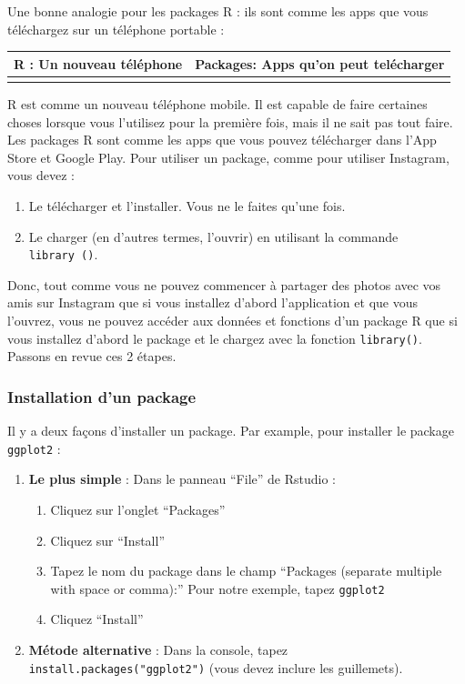 \documentclass[a4paperpaper,]{article}
\providecommand{\tightlist}{%
  \setlength{\itemsep}{0pt}\setlength{\parskip}{0pt}}
\theoremstyle{definition}
\theoremstyle{definition}
\theoremstyle{definition}
\theoremstyle{remark}
\begin{document}
Une bonne analogie pour les packages R : ils sont comme les apps que
vous téléchargez sur un téléphone portable :

\begin{longtable}[]{@{}cc@{}}
\toprule
R : Un nouveau téléphone & Packages: Apps qu'on peut
telécharger\tabularnewline
\midrule
\endhead
&\tabularnewline
\bottomrule
\end{longtable}

R est comme un nouveau téléphone mobile. Il est capable de faire
certaines choses lorsque vous l'utilisez pour la première fois, mais il
ne sait pas tout faire. Les packages R sont comme les apps que vous
pouvez télécharger dans l'App Store et Google Play. Pour utiliser un
package, comme pour utiliser Instagram, vous devez :

\begin{enumerate}
\def\labelenumi{\arabic{enumi}.}
\tightlist
\item
  Le télécharger et l'installer. Vous ne le faites qu'une fois.
\item
  Le charger (en d'autres termes, l'ouvrir) en utilisant la commande
  \texttt{library\ ()}.
\end{enumerate}

Donc, tout comme vous ne pouvez commencer à partager des photos avec vos
amis sur Instagram que si vous installez d'abord l'application et que
vous l'ouvrez, vous ne pouvez accéder aux données et fonctions d'un
package R que si vous installez d'abord le package et le chargez avec la
fonction \texttt{library()}. Passons en revue ces 2 étapes.

\subsubsection{Installation d'un
package}\label{installation-dun-package}

Il y a deux façons d'installer un package. Par example, pour installer
le package \texttt{ggplot2} :

\begin{enumerate}
\def\labelenumi{\arabic{enumi}.}
\tightlist
\item
  \textbf{Le plus simple} : Dans le panneau ``File'' de Rstudio :

  \begin{enumerate}
  \def\labelenumii{\alph{enumii})}
  \tightlist
  \item
    Cliquez sur l'onglet ``Packages''
  \item
    Cliquez sur ``Install''
  \item
    Tapez le nom du package dans le champ ``Packages (separate multiple
    with space or comma):'' Pour notre exemple, tapez \texttt{ggplot2}
  \item
    Cliquez ``Install''
  \end{enumerate}
\item
  \textbf{Métode alternative} : Dans la console, tapez
  \texttt{install.packages("ggplot2")} (vous devez inclure les
  guillemets).
\end{enumerate}
\end{document}
